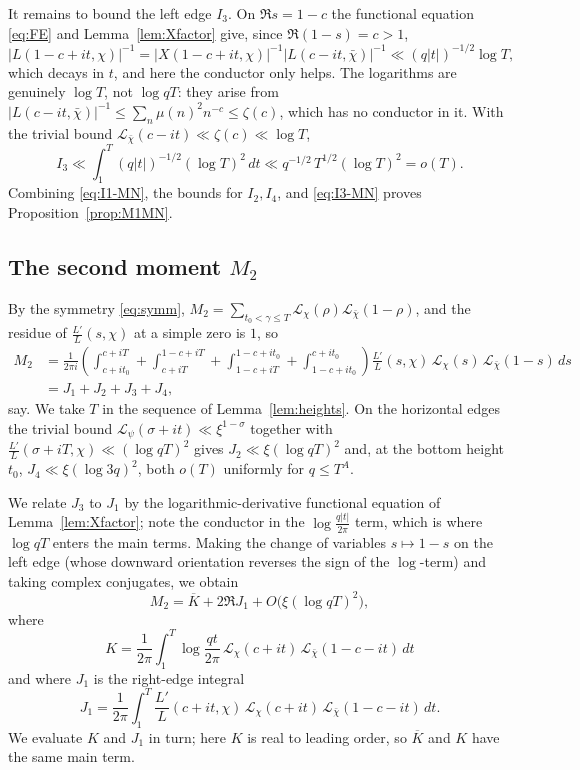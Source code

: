 \documentclass[10pt,a4paper]{amsart}
\numberwithin{equation}{section}
\begin{document}
It remains to bound the left edge $I_3$. On $\Re s=1-c$ the functional equation \eqref{eq:FE} and Lemma~\ref{lem:Xfactor} give, since $\Re(1-s)=c>1$,
\[
\bigl|L(1-c+it,\chi)\bigr|^{-1}=\bigl|X(1-c+it,\chi)\bigr|^{-1}\bigl|L(c-it,\bar\chi)\bigr|^{-1}\ll(q|t|)^{-1/2}\log T,
\]
which decays in $t$, and here the conductor only helps. The logarithms are genuinely $\log T$, not $\log qT$: they arise from $|L(c-it,\bar\chi)|^{-1}\le\sum_n\mu(n)^2n^{-c}\le\zeta(c)$, which has no conductor in it. With the trivial bound $\mathcal{L}_{\bar\chi}(c-it)\ll\zeta(c)\ll\log T$,
\begin{equation}\label{eq:I3-MN}
I_3\ll\int_1^T(q|t|)^{-1/2}(\log T)^2\,dt\ll q^{-1/2}\,T^{1/2}(\log T)^2=o(T).
\end{equation}
Combining \eqref{eq:I1-MN}, the bounds for $I_2,I_4$, and \eqref{eq:I3-MN} proves Proposition~\ref{prop:M1MN}.

\subsection{The second moment $M_2$}
By the symmetry \eqref{eq:symm}, $M_2=\sum_{t_0<\gamma\le T}\mathcal{L}_\chi(\rho)\mathcal{L}_{\bar\chi}(1-\rho)$, and the residue of $\frac{L'}{L}(s,\chi)$ at a simple zero is $1$, so
\[
\begin{aligned}
M_2&=\frac{1}{2\pi i}\left(\int_{c+it_0}^{c+iT}+\int_{c+iT}^{1-c+iT}+\int_{1-c+iT}^{1-c+it_0}+\int_{1-c+it_0}^{c+it_0}\right)\frac{L'}{L}(s,\chi)\,\mathcal{L}_\chi(s)\,\mathcal{L}_{\bar\chi}(1-s)\,ds\\
&=J_1+J_2+J_3+J_4,
\end{aligned}
\]
say. We take $T$ in the sequence of Lemma~\ref{lem:heights}. On the horizontal edges the trivial bound $\mathcal{L}_\psi(\sigma+it)\ll\xi^{1-\sigma}$ together with $\frac{L'}{L}(\sigma+iT,\chi)\ll(\log qT)^2$ gives $J_2\ll\xi(\log qT)^2$ and, at the bottom height $t_0$, $J_4\ll\xi(\log 3q)^2$, both $o(T)$ uniformly for $q\le T^{A}$.

We relate $J_3$ to $J_1$ by the logarithmic-derivative functional equation of Lemma~\ref{lem:Xfactor}; note the conductor in the $\log\frac{q|t|}{2\pi}$ term, which is where $\log qT$ enters the main terms. Making the change of variables $s\mapsto1-s$ on the left edge (whose downward orientation reverses the sign of the $\log$-term) and taking complex conjugates, we obtain
\[
M_2=\overline{K}+2\Re J_1+O\bigl(\xi(\log qT)^2\bigr),
\]
where
\[
K=\frac{1}{2\pi}\int_1^T\log\frac{qt}{2\pi}\,\mathcal{L}_\chi(c+it)\,\mathcal{L}_{\bar\chi}(1-c-it)\,dt
\]
and where $J_1$ is the right-edge integral
\[
J_1=\frac{1}{2\pi}\int_1^T\frac{L'}{L}(c+it,\chi)\,\mathcal{L}_\chi(c+it)\,\mathcal{L}_{\bar\chi}(1-c-it)\,dt .
\]
We evaluate $K$ and $J_1$ in turn; here $K$ is real to leading order, so $\overline K$ and $K$ have the same main term.
\end{document}
